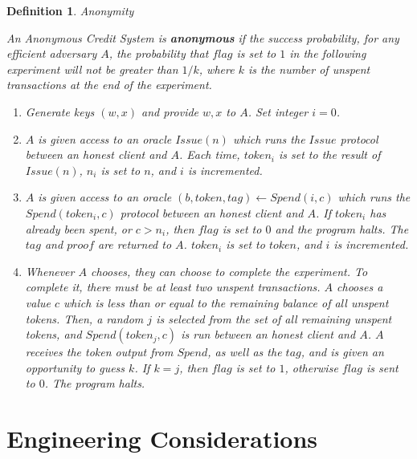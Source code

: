 \documentclass{article}
\newtheorem{definition}{Definition}
\begin{document}
\begin{definition}{Anonymity}

An Anonymous Credit System is \textbf{anonymous} if the success probability,
  for any efficient adversary $A$, the probability that $flag$ is set to $1$ in
  the following experiment will not be greater than $1/k$, where $k$ is the
  number of unspent transactions at the end of the experiment.

\begin{enumerate}

    \item Generate keys $(w, x)$ and provide $w, x$ to $A$. Set integer $i = 0$.

    \item $A$ is given access to an oracle $Issue(n)$ which runs the $Issue$ protocol
      between an honest client and $A$. Each time, $token_i$ is set to the
      result of $Issue(n)$, $n_i$ is set to $n$, and $i$ is incremented.

    \item $A$ is given access to an oracle $(b, token, tag) \leftarrow Spend(i, c)$
      which runs the $Spend(token_i, c)$ protocol between an honest client and $A$. If
      $token_i$ has already been spent, or $c > n_i$, then $flag$ is set to $0$
      and the program halts. The $tag$ and $proof$ are returned to $A$.
      $token_i$ is set to $token$, and $i$ is incremented.

    \item Whenever $A$ chooses, they can choose to complete the experiment. To
      complete it, there must be at least two unspent transactions. $A$ chooses
      a value $c$ which is less than or equal to the remaining balance of all
      unspent tokens. Then, a random $j$ is selected from the set of all
      remaining unspent tokens, and $Spend(token_j, c)$ is run between an
      honest client and $A$. $A$ receives the token output from $Spend$, as
      well as the $tag$, and is given an opportunity to guess $k$. If $k = j$,
      then $flag$ is set to $1$, otherwise $flag$ is sent to $0$. The program
      halts.

\end{enumerate}

\end{definition}

\section{Engineering Considerations}
\end{document}
